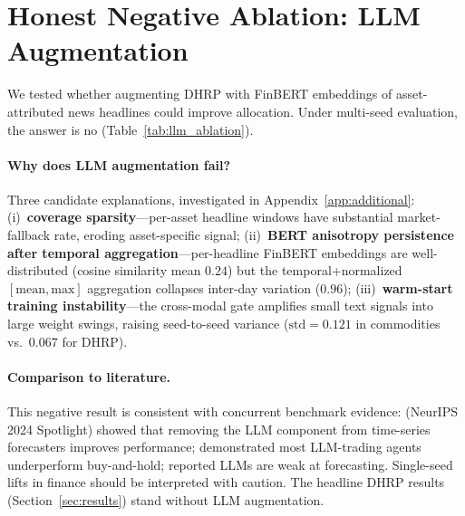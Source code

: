 \section{Honest Negative Ablation: LLM Augmentation}
\label{sec:llmablation}

We tested whether augmenting DHRP with FinBERT \citep{Huang2023}
embeddings of asset-attributed news headlines could improve allocation.
Under multi-seed evaluation, the answer is no
(Table~\ref{tab:llm_ablation}).



\paragraph{Why does LLM augmentation fail?}
Three candidate explanations, investigated in
Appendix~\ref{app:additional}:
(i)~\textbf{coverage sparsity}---per-asset headline windows have
substantial market-fallback rate, eroding asset-specific signal;
(ii)~\textbf{BERT anisotropy persistence after temporal
aggregation}---per-headline FinBERT embeddings are well-distributed
(cosine similarity mean $0.24$) but the temporal+normalized
$[\text{mean}, \text{max}]$ aggregation collapses inter-day variation
($0.96$); (iii)~\textbf{warm-start training instability}---the
cross-modal gate amplifies small text signals into large weight
swings, raising seed-to-seed variance ($\mathrm{std}=0.121$ in
commodities vs.\ $0.067$ for DHRP).

\paragraph{Comparison to literature.}
This negative result is consistent with concurrent benchmark evidence:
\citet{Tan2024AreLMs} (NeurIPS 2024 Spotlight) showed that removing the
LLM component from time-series forecasters improves performance;
\citet{Chen2025StockBench} demonstrated most LLM-trading agents
underperform buy-and-hold; \citet{Xie2024FinBen} reported LLMs are weak
at forecasting. Single-seed lifts in finance \citep{Kirtac2025} should
be interpreted with caution. The headline DHRP results
(Section~\ref{sec:results}) stand without LLM augmentation.
